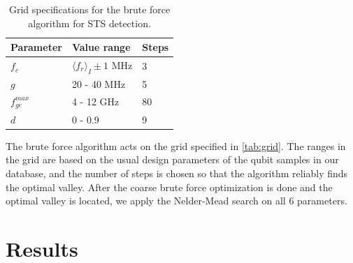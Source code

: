 \documentclass[%
 aip,
 amsmath,amssymb,
 reprint,%
]{revtex4-1}
\begin{document}
\begin{table}
	\centering
	\begin{ruledtabular}
		\begin{tabular}{lll} 
			Parameter & Value range & Steps \\ 
			\hline
			$f_c$ & $\langle f_r \rangle_{I} \pm 1$ MHz & 3\\ 
			$g$ & 20 - 40 MHz & 5\\
			$f_{ge}^{max}$ &  4 - 12 GHz & 80 \\
			$d$& 0 - 0.9 & 9
		\end{tabular} 
	\end{ruledtabular}
	\caption{Grid specifications for the brute force algorithm for STS detection.}
	\label{tab:grid}
\end{table}

The brute force algorithm acts on the grid specified in \autoref{tab:grid}. The ranges in the grid are based on the usual design parameters of the qubit samples in our database, and the number of steps is chosen so that the algorithm reliably finds the optimal valley. After the coarse brute force optimization is done and the optimal valley is located, we apply the Nelder-Mead search on all 6 parameters.


\section{Results}
\end{document}
